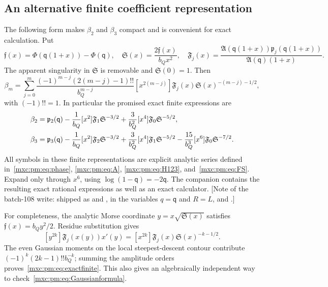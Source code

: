 \documentclass[11pt]{article}
\numberwithin{equation}{section}
\theoremstyle{definition}
\theoremstyle{remark}
\begin{document}
\subsection{An alternative finite coefficient representation}
The following form makes $\beta_2$ and $\beta_3$ compact and is convenient for
exact calculation. Put
\begin{equation}\label{mxc:pm:eq:FS}
 \mathfrak f(x)=\Phi(\mathsf q(1+x))-\Phi(\mathsf q),\quad
 \mathfrak S(x)=\frac{2\mathfrak f(x)}{b_Q x^2},\quad
 \mathfrak F_j(x)=\frac{\mathfrak A(\mathsf q(1+x))\mathfrak p_j(\mathsf q(1+x))}{\mathfrak A(\mathsf q)(1+x)}.
\end{equation}
The apparent singularity in $\mathfrak S$ is removable and $\mathfrak S(0)=1$.
Then
\begin{equation}\label{mxc:pm:eq:exactfinite}
 \beta_m=\sum_{j=0}^m
 \frac{(-1)^{m-j}(2(m-j)-1)!!}{b_Q^{m-j}}
 [x^{2(m-j)}]\mathfrak F_j(x)\mathfrak S(x)^{-(m-j)-1/2},
\end{equation}
with $(-1)!!=1$. In particular the promised exact finite expressions are
\begin{align}\label{mxc:pm:eq:C23}
 \beta_2={}&\mathfrak p_2(\mathsf q)-\frac1{b_Q}[x^2]\mathfrak F_1\mathfrak S^{-3/2}
                   +\frac3{b_Q^2}[x^4]\mathfrak F_0\mathfrak S^{-5/2},\notag\\
 \beta_3={}&\mathfrak p_3(\mathsf q)-\frac1{b_Q}[x^2]\mathfrak F_2\mathfrak S^{-3/2}
           +\frac3{b_Q^2}[x^4]\mathfrak F_1\mathfrak S^{-5/2}
           -\frac{15}{b_Q^3}[x^6]\mathfrak F_0\mathfrak S^{-7/2}.
\end{align}
All symbols in these finite representations are explicit analytic series
defined in~\eqref{mxc:pm:eq:phase}, \eqref{mxc:pm:eq:A}, \eqref{mxc:pm:eq:H123},
and~\eqref{mxc:pm:eq:FS}. Expand only through $x^6$, using
$\log(1-\mathsf q)=-2\mathsf q$. The companion contains the resulting exact
rational expressions as well as an exact calculator. [Note of the batch-108
write: shipped as 
and , in the variables
$q=\mathsf q$ and $R=L$, and .]

For completeness, the analytic Morse coordinate $y=x\sqrt{\mathfrak S(x)}$
satisfies $\mathfrak f(x)=b_Qy^2/2$. Residue substitution gives
\[
 [y^{2k}]\mathfrak F_j(x(y))x'(y)
   =[x^{2k}]\mathfrak F_j(x)\mathfrak S(x)^{-k-1/2}.
\]
The even Gaussian moments on the local steepest-descent contour contribute
$(-1)^k(2k-1)!!b_Q^{-k}$; summing the amplitude orders
proves~\eqref{mxc:pm:eq:exactfinite}. This also gives an algebraically
independent way to check~\eqref{mxc:pm:eq:Gaussianformula}.
\end{document}
